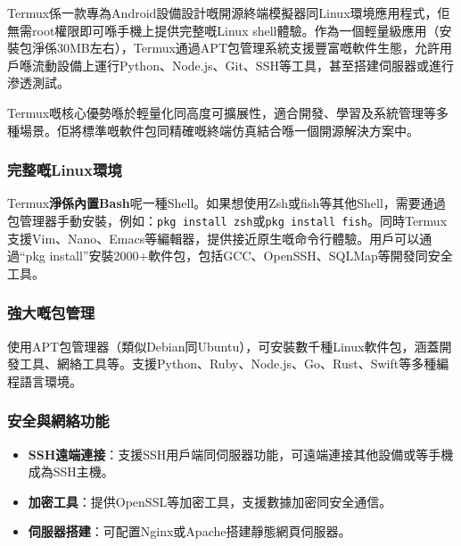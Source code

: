 


Termux係一款專為Android設備設計嘅開源終端模擬器同Linux環境應用程式，佢無需root權限即可喺手機上提供完整嘅Linux shell體驗。作為一個輕量級應用（安裝包淨係30MB左右），Termux通過APT包管理系統支援豐富嘅軟件生態，允許用戶喺流動設備上運行Python、Node.js、Git、SSH等工具，甚至搭建伺服器或進行滲透測試。

Termux嘅核心優勢喺於輕量化同高度可擴展性，適合開發、學習及系統管理等多種場景。佢將標準嘅軟件包同精確嘅終端仿真結合喺一個開源解決方案中。


\subsubsection*{完整嘅Linux環境}

Termux\textbf{淨係內置Bash}呢一種Shell。如果想使用Zsh或fish等其他Shell，需要通過包管理器手動安裝，例如：\texttt{pkg install zsh}或\texttt{pkg install fish}。同時Termux支援Vim、Nano、Emacs等編輯器，提供接近原生嘅命令行體驗。用戶可以通過“pkg install”安裝2000+軟件包，包括GCC、OpenSSH、SQLMap等開發同安全工具。

\subsubsection*{強大嘅包管理}

使用APT包管理器（類似Debian同Ubuntu），可安裝數千種Linux軟件包，涵蓋開發工具、網絡工具等。支援Python、Ruby、Node.js、Go、Rust、Swift等多種編程語言環境。

\subsubsection*{安全與網絡功能}

\begin{itemize}
  \item \textbf{SSH遠端連接}：支援SSH用戶端同伺服器功能，可遠端連接其他設備或等手機成為SSH主機。
  \item \textbf{加密工具}：提供OpenSSL等加密工具，支援數據加密同安全通信。
  \item \textbf{伺服器搭建}：可配置Nginx或Apache搭建靜態網頁伺服器。
\end{itemize}

